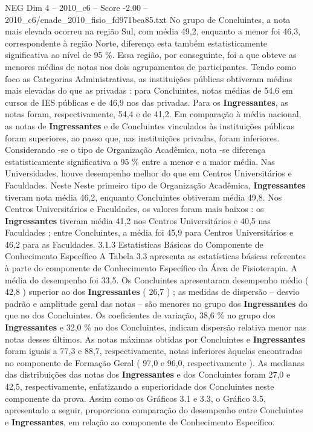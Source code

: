 \begin{textsample}{NEG Dim 4 – 2010\_c6 – Score -2.00 – 2010\_c6/enade\_2010\_fisio\_fd971bea85.txt}
No grupo de Concluintes, a nota mais elevada ocorreu na região Sul, com média 49,2, enquanto a menor foi 46,3, correspondente à região Norte, diferença esta também estatisticamente significativa ao nível de 95 \%.
Essa região, por conseguinte, foi a que obteve as menores médias de notas nos dois agrupamentos de participantes.
Tendo como foco as Categorias Administrativas, as instituições públicas obtiveram médias mais elevadas do que as privadas : para Concluintes, notas médias de 54,6 em cursos de IES públicas e de 46,9 nos das privadas.
Para os \textbf{Ingressantes}, as notas foram, respectivamente, 54,4 e de 41,2.
Em comparação à média nacional, as notas de \textbf{Ingressantes} e de Concluintes vinculados às instituições públicas foram superiores, ao passo que, nas instituições privadas, foram inferiores.
Considerando -se o tipo de Organização Acadêmica, nota -se diferença estatisticamente significativa a 95 \% entre a menor e a maior média.
Nas Universidades, houve desempenho melhor do que em Centros Universitários e Faculdades.
Neste Neste primeiro tipo de Organização Acadêmica, \textbf{Ingressantes} tiveram nota média 46,2, enquanto Concluintes obtiveram média 49,8.
Nos Centros Universitários e Faculdades, os valores foram mais baixos : os \textbf{Ingressantes} tiveram média 41,2 nos Centros Universitários e 40,5 nas Faculdades ; entre Concluintes, a média foi 45,9 para Centros Universitários e 46,2 para as Faculdades. 3.1.3 Estatísticas Básicas do Componente de Conhecimento Específico A Tabela 3.3 apresenta as estatísticas básicas referentes à parte do componente de Conhecimento Específico da Área de Fisioterapia.
A média do desempenho foi 33,5.
Os Concluintes apresentaram desempenho médio ( 42,8 ) superior ao dos \textbf{Ingressantes} ( 26,7 ) ; as medidas de dispersão – desvio padrão e amplitude geral das notas – são menores no grupo dos \textbf{Ingressantes} do que no dos Concluintes.
Os coeficientes de variação, 38,6 \% no grupo dos \textbf{Ingressantes} e 32,0 \% no dos Concluintes, indicam dispersão relativa menor nas notas desses últimos.
As notas máximas obtidas por Concluintes e \textbf{Ingressantes} foram iguais a 77,3 e 88,7, respectivamente, notas inferiores àquelas encontradas no componente de Formação Geral ( 97,0 e 96,0, respectivamente ).
As medianas das distribuições das notas dos \textbf{Ingressantes} e dos Concluintes foram 27,0 e 42,5, respectivamente, enfatizando a superioridade dos Concluintes neste componente da prova.
Assim como os Gráficos 3.1 e 3.3, o Gráfico 3.5, apresentado a seguir, proporciona comparação do desempenho entre Concluintes e \textbf{Ingressantes}, em relação ao componente de Conhecimento Específico.

\end{textsample}

